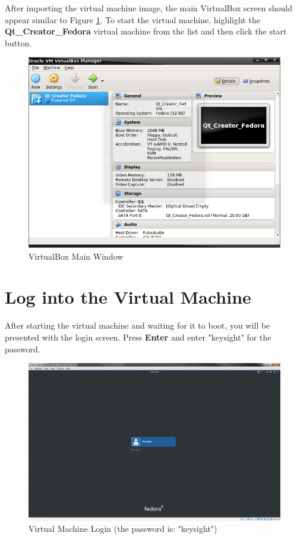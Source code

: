 \documentclass{article}
\begin{document}
After importing the virtual machine image, the main VirtualBox screen should appear similar to Figure \ref{VirtualBox_Main_Window}. To start the virtual machine, highlight the \textbf{Qt\_Creator\_Fedora} virtual machine from the list and then click the start button.

	\begin{figure}[H]
		\centering
		\includegraphics[scale=0.35]{pics/VirtualBox_Main_View.png}
		\caption{VirtualBox Main Window}
		\label{VirtualBox_Main_Window}
	\end{figure}


\section{Log into the Virtual Machine}

After starting the virtual machine and waiting for it to boot, you will be presented with the login screen. Press \textbf{Enter} and enter "keysight" for the password.

	\begin{figure}[H]
		\centering
		\includegraphics[scale=0.25]{pics/VM_Login.png}
		\caption{Virtual Machine Login (the password is: "keysight")}
		\label{VM_login}
	\end{figure}
\end{document}
